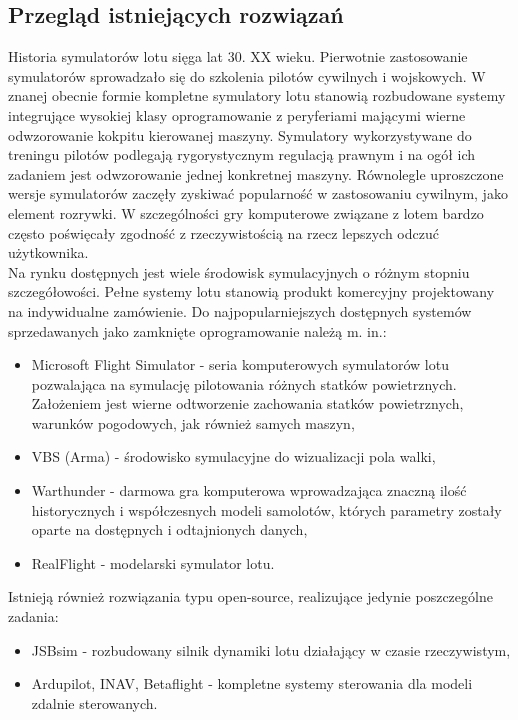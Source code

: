 \documentclass[15pt]{sprawozdanie}
\begin{document}
\subsection{Przegląd istniejących rozwiązań}

Historia symulatorów lotu sięga lat 30. XX wieku. Pierwotnie zastosowanie symulatorów sprowadzało się do szkolenia pilotów cywilnych i wojskowych. W znanej obecnie formie kompletne symulatory lotu stanowią rozbudowane systemy integrujące wysokiej klasy oprogramowanie z peryferiami mającymi wierne odwzorowanie kokpitu kierowanej maszyny. Symulatory wykorzystywane do treningu pilotów podlegają rygorystycznym regulacją prawnym i na ogół ich zadaniem jest odwzorowanie jednej konkretnej maszyny. Równolegle uproszczone wersje symulatorów zaczęły zyskiwać popularność w zastosowaniu cywilnym, jako element rozrywki. W szczególności gry komputerowe związane z lotem bardzo często poświęcały zgodność z rzeczywistością na rzecz lepszych odczuć użytkownika.\\

Na rynku dostępnych jest wiele środowisk symulacyjnych o różnym stopniu szczegółowości. Pełne systemy lotu stanowią produkt komercyjny projektowany na indywidualne zamówienie. Do najpopularniejszych dostępnych systemów sprzedawanych jako zamknięte oprogramowanie należą m. in.:

\begin{itemize}
\item Microsoft Flight Simulator -  seria komputerowych symulatorów lotu pozwalająca na symulację pilotowania różnych statków powietrznych. Założeniem jest wierne odtworzenie zachowania statków powietrznych, warunków pogodowych, jak również samych maszyn,
\item VBS (Arma) - środowisko symulacyjne do wizualizacji pola walki,
\item Warthunder - darmowa gra komputerowa wprowadzająca znaczną ilość historycznych i współczesnych modeli samolotów, których parametry zostały oparte na dostępnych i odtajnionych danych,
\item RealFlight - modelarski symulator lotu.
\end{itemize}

Istnieją również rozwiązania typu open-source, realizujące jedynie poszczególne zadania:

\begin{itemize}
\item JSBsim - rozbudowany silnik dynamiki lotu działający w czasie rzeczywistym,
\item Ardupilot, INAV, Betaflight - kompletne systemy sterowania dla modeli zdalnie sterowanych.
\end{itemize}
\end{document}
